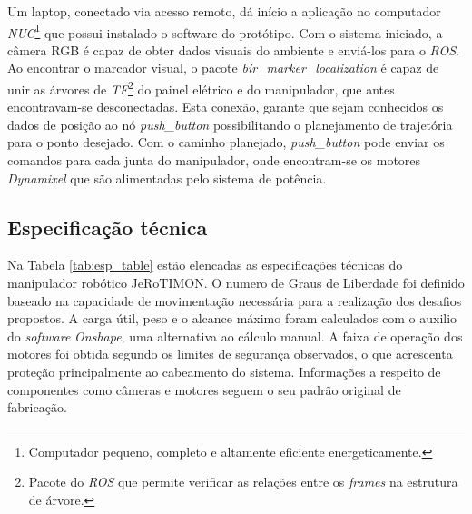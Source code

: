 Um laptop, conectado via acesso remoto, dá início a aplicação no computador \textit{NUC}\footnote{Computador pequeno, completo e altamente eficiente energeticamente.} que possui instalado o software do protótipo.  Com o sistema iniciado, a câmera RGB é capaz de obter dados visuais do ambiente e enviá-los para o \textit{\acs{ROS}}.  Ao encontrar o marcador visual, o pacote \textit{bir\_marker\_localization} é capaz de unir as árvores de \textit{TF}\footnote{Pacote do \textit{\acs{ROS}} que permite verificar as relações entre os \textit{frames} na estrutura de árvore.} do painel elétrico e do manipulador, que antes encontravam-se desconectadas. Esta conexão, garante que sejam conhecidos os dados de posição ao nó \textit{push\_button} possibilitando o planejamento de trajetória para o ponto desejado. Com o caminho planejado, \textit{push\_button} pode enviar os comandos para cada junta do manipulador, onde encontram-se os motores \textit{Dynamixel} que são alimentadas pelo sistema de potência.

\subsection{Especificação técnica}
\label{sub:esptec}

Na Tabela \ref{tab:esp_table} estão elencadas as especificações técnicas do manipulador robótico JeRoTIMON. O numero de Graus de Liberdade foi definido baseado na capacidade de movimentação necessária para a realização dos desafios propostos. A carga útil, peso e o alcance máximo foram calculados com o auxilio do \textit{software} \textit{Onshape}, uma alternativa ao cálculo manual. A faixa de operação dos motores foi obtida segundo os limites de segurança observados, o que acrescenta proteção principalmente ao cabeamento do sistema. Informações a respeito de componentes como câmeras e motores seguem o seu padrão original de fabricação.

